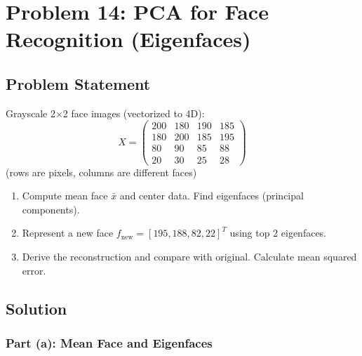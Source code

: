 \documentclass[12pt]{article}
\begin{document}
\newpage
\section{Problem 14: PCA for Face Recognition (Eigenfaces)}

\subsection{Problem Statement}

Grayscale 2×2 face images (vectorized to 4D):
\[
X = \begin{pmatrix}
200 & 180 & 190 & 185 \\
180 & 200 & 185 & 195 \\
80 & 90 & 85 & 88 \\
20 & 30 & 25 & 28
\end{pmatrix}
\]
(rows are pixels, columns are different faces)

\begin{enumerate}
\item[(a)] Compute mean face \(\bar{x}\) and center data. Find eigenfaces (principal components).
\item[(b)] Represent a new face \(f_{\text{new}} = [195, 188, 82, 22]^T\) using top 2 eigenfaces.
\item[(c)] Derive the reconstruction and compare with original. Calculate mean squared error.
\end{enumerate}

\subsection{Solution}

\subsubsection{Part (a): Mean Face and Eigenfaces}
\end{document}
